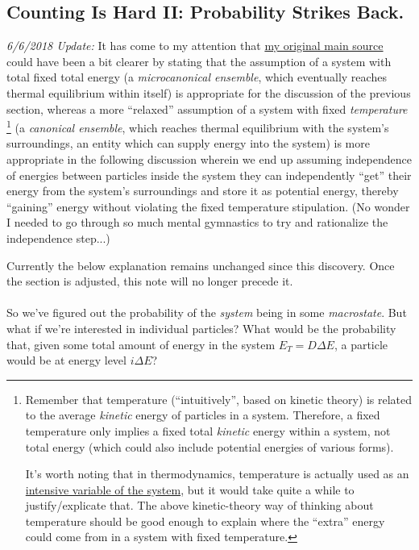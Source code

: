 \documentclass[letterpaper,12pt]{report}
\begin{document}
\subsection{Counting Is Hard II: Probability Strikes Back.}

\emph{6/6/2018 Update:} It has come to my attention that
\href{https://courses.physics.ucsd.edu/2017/Spring/physics4e/boltzmann.pdf}{my original main source}
could have been a bit clearer by stating that the assumption of a system with
total fixed total energy
(a \emph{microcanonical ensemble}, which eventually reaches thermal equilibrium within itself)
is appropriate for the discussion of the previous section,
whereas a more ``relaxed'' assumption of a system with fixed \emph{temperature}
\footnote{
  Remember that temperature (``intuitively'', based on kinetic theory) 
  is related to the average \emph{kinetic} energy
  of particles in a system. Therefore, a fixed temperature only implies a fixed total
  \emph{kinetic} energy within a system, not total energy (which could also include
  potential energies of various forms).
  \par
  It's worth noting that in thermodynamics,
  temperature is actually used as an
  \href{https://en.wikipedia.org/wiki/Temperature\#Temperature_as_an_intensive_variable}{intensive variable of the system}, 
  but it would take quite a while to justify/explicate that.
  The above kinetic-theory way of thinking about temperature
  should be good enough to explain where the ``extra'' energy
  could come from in a system with fixed temperature.
}
(a \emph{canonical ensemble}, which reaches thermal equilibrium with the system's surroundings,
an entity which can supply energy into the system)
is more appropriate in the following discussion wherein we
end up assuming independence of energies between particles inside the system 
\textemdash{} they can independently ``get'' their energy from the system's surroundings
and store it as potential energy, thereby ``gaining'' energy without violating the
fixed temperature stipulation.
(No wonder I needed to go through so much mental gymnastics to try and rationalize
the independence step...)

\par
Currently the below explanation remains unchanged since this discovery.
Once the section is adjusted, this note will no longer precede it.
\\
\\
So we've figured out the probability of the \emph{system} being in some \emph{macrostate}.
But what if we're interested in individual particles?
What would be the probability that, given some total
amount of energy in the system \(E_{{T}}=D\Delta E\),
a particle would be at energy level \(i\Delta E\)?
\end{document}
